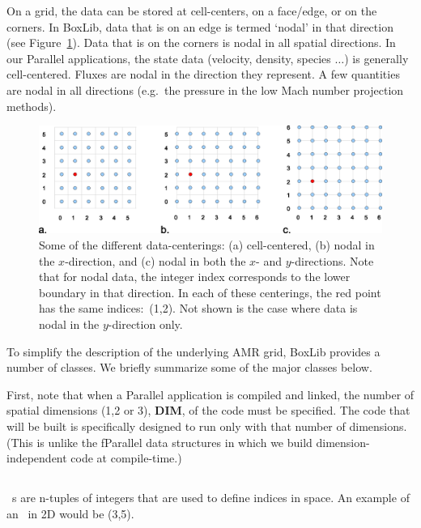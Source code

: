 On a grid, the data can be stored at cell-centers, on a face/edge, or
on the corners.  In BoxLib, data that is on an edge is termed `nodal'
in that direction (see Figure~\ref{fig:dataloc}).  Data that is on the
corners is nodal in all spatial directions.  In our Parallel applications, 
the state data (velocity, density, species $\ldots$) is generally
cell-centered.  Fluxes are nodal in the direction they represent.
A few quantities are nodal in all directions (e.g.\ the pressure in
the low Mach number projection methods).

\begin{figure}[h]
\centering
\includegraphics[width=6.5in]{./BoxLib/data_loc2}
\caption{\label{fig:dataloc} Some of the different data-centerings:
(a) cell-centered, (b) nodal in the $x$-direction, and (c) nodal in
both the $x$- and $y$-directions.  Note that for nodal data, the
integer index corresponds to the lower boundary in that direction.
In each of these centerings, the red point has the same indices:\ (1,2).
Not shown is the case where data is nodal in the $y$-direction only.}
\end{figure}

To simplify the description of the underlying AMR grid, BoxLib
provides a number of classes.  We briefly summarize some of the major
classes below.

First, note that when a Parallel application is compiled and linked,
the number of spatial dimensions (1,2 or 3), {\bf DIM},
 of the code must be specified.  The code that will be
built is specifically designed to run only with that number of dimensions.
(This is unlike the fParallel data structures in which we build
dimension-independent code at compile-time.)

\subsection{\IntVect}

\IntVect~s are n-tuples of integers that are used to define
indices in space.  An example of an \IntVect\ in 2D would
be (3,5).

